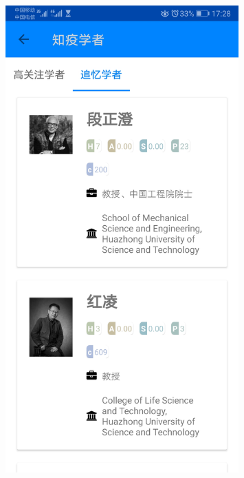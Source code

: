 \documentclass[UTF8]{article}
\begin{document}
\begin{figure}[htbp]
{\begin{minipage}[t]{0.25\linewidth}
        \includegraphics[width=0.8\textwidth]{scholar2}
        \end{minipage}%
        }%
\end{figure}
\end{document}
